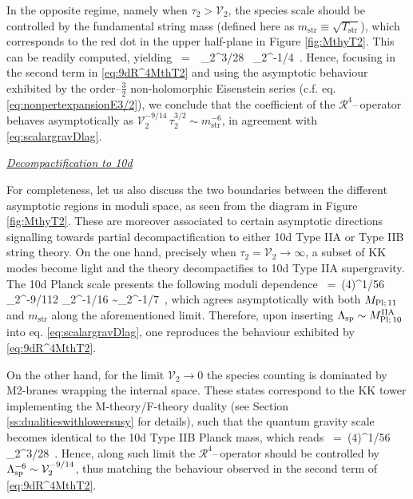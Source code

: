 In the opposite regime, namely when $\tau_2 > \mathcal{V}_2$, the species scale should be controlled by the fundamental string mass (defined here as $m_{\text{str}} \equiv \sqrt{T_{\text{str}}}$), which corresponds to the red dot in the upper half-plane in Figure \ref{fig:MthyT2}. This can be readily computed, yielding
%
\beq
{}\, =\, \, _2^{3/28} \, \tau_2^{-1/4}\, .
\label{eq:fundstringmass9d}
\eeq
%
Hence, focusing in the second term in \eqref{eq:9dR^4MthT2} and using the asymptotic behaviour exhibited by the order--$\frac32$ non-holomorphic Eisenstein series (c.f. eq. \eqref{eq:nonpertexpansionE3/2}), we conclude that the coefficient of the $\mathcal{R}^4$--\,operator behaves asymptotically as $\mathcal{V}_2^{-9/14}\, \tau_2^{3/2} \sim m_{\text{str}}^{-6}$, in agreement with \eqref{eq:scalargravDlag}.
\newline

\underline{\textit{Decompactification to 10d}}
\newline

For completeness, let us also discuss the two boundaries between the different asymptotic regions in moduli space, as seen from the diagram in Figure \ref{fig:MthyT2}. These are moreover associated to certain asymptotic directions signalling towards partial decompactification to either 10d Type IIA or Type IIB string theory. On the one hand, precisely when $\tau_2 = \mathcal{V}_2 \to \infty$, a subset of KK modes become light and the theory decompactifies to 10d Type IIA supergravity. The 10d Planck scale presents the following moduli dependence
%
\beq
{}\, =\, (4\pi)^{1/56}\, _2^{-9/112} \tau_2^{-1/16} \sim {}_2^{-1/7}\, ,
\label{eq:10dPlanckmassIIA}
\eeq
%
which agrees asymptotically with both $M_{\rm Pl;\, 11}$ and $m_{\text{str}}$ along the aforementioned limit. Therefore, upon inserting $\Lambda_{\text{sp}} \sim M^{\rm IIA}_{\rm Pl;\, 10}$ into eq. \eqref{eq:scalargravDlag}, one reproduces the behaviour exhibited by \eqref{eq:9dR^4MthT2}.

On the other hand, for the limit $\mathcal{V}_2 \to 0$ the species counting is dominated by M2-branes wrapping the internal space. These states correspond to the KK tower implementing the M-theory/F-theory duality (see Section \ref{ss:dualitieswithlowersusy} for details), such that the quantum gravity scale becomes identical to the 10d Type IIB Planck mass, which reads
%
\beq
{}\, =\, (4\pi)^{1/56}\, _2^{3/28}\, .
\label{eq:10dPlanckmass}
\eeq
%
Hence, along such limit the $\mathcal{R}^4$--\,operator should be controlled by $\Lambda_{\text{sp}}^{-6} \sim \mathcal{V}_2^{-9/14}$, thus matching the behaviour observed in the second term of \eqref{eq:9dR^4MthT2}.

